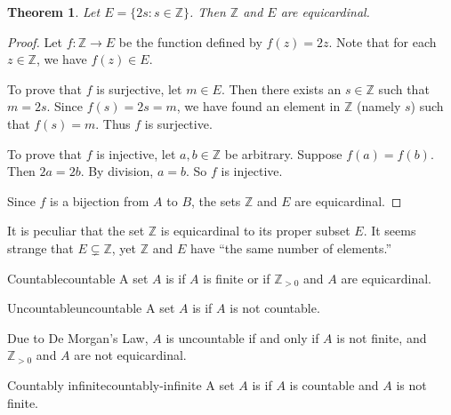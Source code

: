 \documentclass{book}
\newcounter{ekcounter}%
\theoremstyle{ekimcustom}
\newtheorem{theorem}[ekcounter]{Theorem}
\newcommand\defn[1]{{\color{blue}{\bf #1}}}
\begin{document}
\begin{theorem}
Let $E = \{2s : s \in \mathbb{Z}\}$. Then $\mathbb{Z}$ and $E$ are equicardinal.
\end{theorem}
\begin{proof}
Let $f : \mathbb{Z} \to E$ be the function defined by $f(z)=2z$. Note that for each $z \in \mathbb{Z}$, we have $f(z) \in E$.

To prove that $f$ is surjective, let $m \in E$. Then there exists an $s \in \mathbb{Z}$ such that $m=2s$. Since $f(s)=2s=m$, we have found an element in $\mathbb{Z}$ (namely $s$) such that $f(s)=m$. Thus $f$ is surjective.

To prove that $f$ is injective, let $a, b \in \mathbb{Z}$ be arbitrary. Suppose $f(a)=f(b)$. Then $2a=2b$. By division, $a=b$. So $f$ is injective.

Since $f$ is a bijection from $A$ to $B$, the sets $\mathbb{Z}$ and $E$ are equicardinal.
\end{proof}
It is peculiar that the set $\mathbb{Z}$ is equicardinal to its proper subset $E$. It seems strange that $E \subsetneq \mathbb{Z}$, yet $\mathbb{Z}$ and $E$ have ``the same number of elements.''

\begin{bdefinition}{Countable}{countable}
A set $A$ is \defn{countable} if $A$ is finite or if $\mathbb{Z}_{>0}$ and $A$ are equicardinal.
\end{bdefinition}

\begin{bdefinition}{Uncountable}{uncountable}
A set $A$ is \defn{uncountable} if $A$ is not countable.
\end{bdefinition}
Due to De Morgan's Law, $A$ is uncountable if and only if $A$ is not finite, and $\mathbb{Z}_{>0}$ and $A$ are not equicardinal.

\begin{bdefinition}{Countably infinite}{countably-infinite}
A set $A$ is \defn{countably infinite} if $A$ is countable and $A$ is not finite.
\end{bdefinition}
\end{document}
